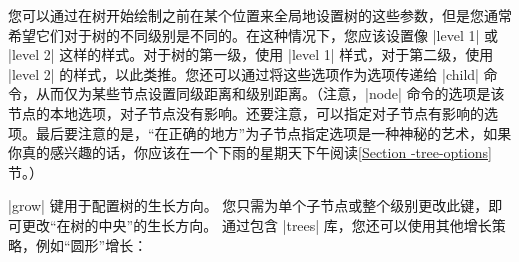 
您可以通过在树开始绘制之前在某个位置来全局地设置树的这些参数，但是您通常希望它们对于树的不同级别是不同的。在这种情况下，您应该设置像 |level 1| 或 |level 2| 这样的样式。对于树的第一级，使用 |level 1| 样式，对于第二级，使用 |level 2| 的样式，以此类推。您还可以通过将这些选项作为选项传递给 |child| 命令，从而仅为某些节点设置同级距离和级别距离。（注意，|node| 命令的选项是该节点的本地选项，对子节点没有影响。还要注意，可以指定对子节点有影响的选项。最后要注意的是，``在正确的地方''为子节点指定选项是一种神秘的艺术，如果你真的感兴趣的话，你应该在一个下雨的星期天下午阅读\ref{Section -tree-options}节。）


|grow| 键用于配置树的生长方向。 您只需为单个子节点或整个级别更改此键，即可更改``在树的中央''的生长方向。 通过包含 |trees| 库，您还可以使用其他增长策略，例如``圆形''增长：

